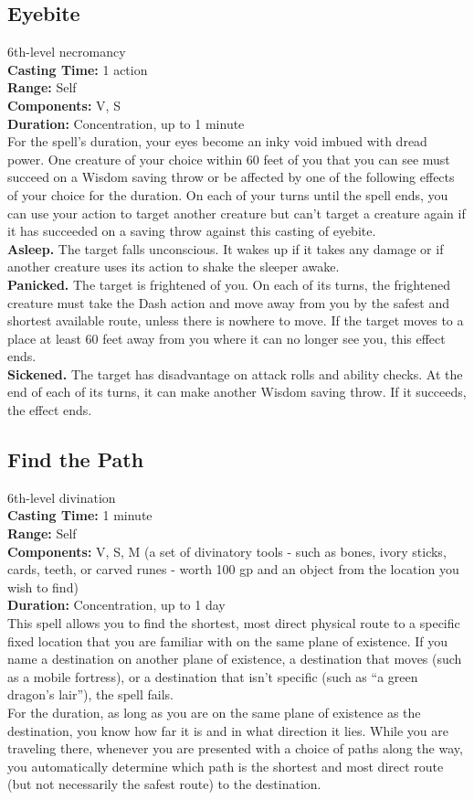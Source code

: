 \documentclass[11pt, A4paper, english]{article}
\begin{document}
		\subsection{Eyebite}
6th-level necromancy \\
\textbf{Casting Time:} 1 action \\
\textbf{Range:} Self \\
\textbf{Components:} V, S \\
\textbf{Duration:} Concentration, up to 1 minute \\
For the spell’s duration, your eyes become an inky void imbued with dread power. One creature of your choice within 60 feet of you that you can see must succeed on a Wisdom  saving throw or be affected by one of the following effects of your choice for the duration. On each of your turns until the spell ends, you can use your action to target another creature but can’t target a creature again if it has succeeded on a saving throw against this casting of eyebite. \\
\textbf{Asleep.} The target falls unconscious. It wakes up if it takes any damage or if another creature uses its action to shake the sleeper awake. \\
\textbf{Panicked.} The target is frightened of you. On each of its turns, the frightened creature must take the Dash action and move away from you by the safest and shortest available route, unless there is nowhere to move. If the target moves to a place at least 60 feet away from you where it can no longer see you, this effect ends. \\
\textbf{Sickened.} The target has disadvantage on attack rolls and ability checks. At the end of each of its turns, it can make another Wisdom saving throw. If it succeeds, the effect ends.

		\subsection{Find the Path}
6th-level divination \\
\textbf{Casting Time:} 1 minute \\
\textbf{Range:} Self \\
\textbf{Components:} V, S, M (a set of divinatory tools - such as bones, ivory sticks, cards, teeth, or carved runes - worth 100 gp and an object from the location you wish to find) \\
\textbf{Duration:} Concentration, up to 1 day \\
This spell allows you to find the shortest, most direct physical route to a specific fixed location that you are familiar with on the same plane of existence. If you name a destination on another plane of existence, a destination that moves (such as a mobile fortress), or a destination that isn’t specific (such as “a green dragon’s lair”), the spell fails. \\
For the duration, as long as you are on the same plane of existence as the destination, you know how far it is and in what direction it lies. While you are traveling there, whenever you are presented with a choice of paths along the way, you automatically determine which path is the shortest and most direct route (but not necessarily the safest route) to the destination.
\end{document}
